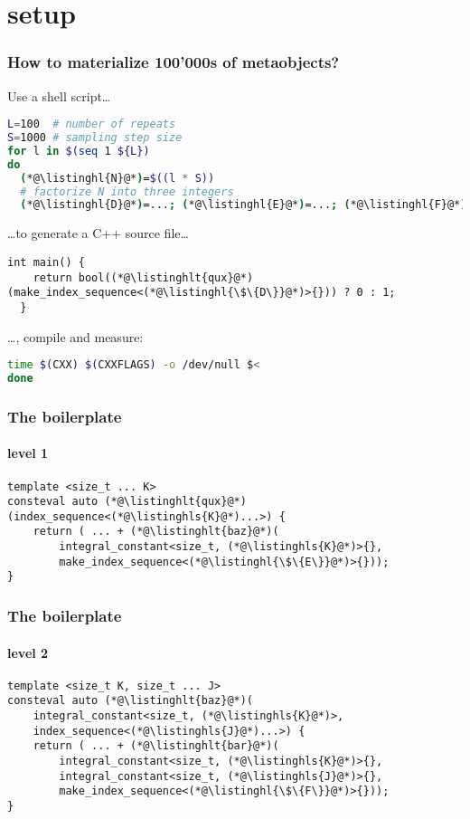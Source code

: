 \documentclass[compress,table,xcolor=table]{beamer}
\begin{document}
\section{setup}
\begin{frame}[fragile]
  \frametitle{How to materialize 100'000s of metaobjects?}
  Use a shell script\ldots
  \begin{lstlisting}[language=bash,basicstyle=\scriptsize\ttfamily]
L=100  # number of repeats
S=1000 # sampling step size
for l in $(seq 1 ${L})
do
  (*@\listinghl{N}@*)=$((l * S))
  # factorize N into three integers
  (*@\listinghl{D}@*)=...; (*@\listinghl{E}@*)=...; (*@\listinghl{F}@*)=...
  \end{lstlisting}
  \ldots to generate a C++ source file\ldots
  \begin{lstlisting}[language=c++2x,basicstyle=\scriptsize\ttfamily]
  int main() {
    return bool((*@\listinghlt{qux}@*)(make_index_sequence<(*@\listinghl{\$\{D\}}@*)>{})) ? 0 : 1;
  }
  \end{lstlisting}
  \ldots, compile and measure:
  \begin{lstlisting}[language=bash,basicstyle=\scriptsize\ttfamily]
  time $(CXX) $(CXXFLAGS) -o /dev/null $<
done
  \end{lstlisting}
\end{frame}
\begin{frame}[fragile]
  \frametitle{The boilerplate}
  \framesubtitle{level 1}
  \begin{lstlisting}[language=c++2x,basicstyle=\normalsize\ttfamily]
template <size_t ... K>
consteval auto (*@\listinghlt{qux}@*)(index_sequence<(*@\listinghls{K}@*)...>) {
	return ( ... + (*@\listinghlt{baz}@*)(
		integral_constant<size_t, (*@\listinghls{K}@*)>{},
		make_index_sequence<(*@\listinghl{\$\{E\}}@*)>{}));
}
  \end{lstlisting}
\end{frame}
\begin{frame}[fragile]
  \frametitle{The boilerplate}
  \framesubtitle{level 2}
  \begin{lstlisting}[language=c++2x,basicstyle=\normalsize\ttfamily]
template <size_t K, size_t ... J>
consteval auto (*@\listinghlt{baz}@*)(
	integral_constant<size_t, (*@\listinghls{K}@*)>,
	index_sequence<(*@\listinghls{J}@*)...>) {
	return ( ... + (*@\listinghlt{bar}@*)(
		integral_constant<size_t, (*@\listinghls{K}@*)>{},
		integral_constant<size_t, (*@\listinghls{J}@*)>{},
		make_index_sequence<(*@\listinghl{\$\{F\}}@*)>{}));
}
  \end{lstlisting}
\end{frame}
\end{document}
